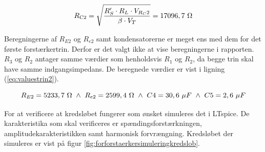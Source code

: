 \begin{equation}
R_{\mathrm{C2}} = \sqrt{\frac{R'_S \cdot R_L \cdot V_{R_C2}}{\beta \cdot V_T}} = 17096,7~\ohm
\label{eq:rc2maks}
\end{equation}

Beregningerne af $R_{E2}$ og $R_{e2}$ samt kondensatorerne er meget ens med dem for det første forstærkertrin. Derfor er det valgt ikke at vise beregningerne i rapporten. $R_3$ og $R_2$ antager samme værdier som henholdsvis $R_1$ og $R_2$, da begge trin skal have samme indgangsimpedans. De beregnede værdier er vist i ligning (\ref{eq:valuestrin2}).

\begin{equation}
R_{E2}=5233,7~\ohm ~ \wedge ~R_{e2}=2599,4~\ohm ~ \wedge ~ C4=30,6~\mu F ~ \wedge ~ C5=2,6~\mu F
\label{eq:valuestrin2}
\end{equation}

For at verificere at kredsløbet fungerer som ønsket simuleres det i LTspice. De karakteristika som skal verificeres er spændingsforstærkningen, amplitudekarakteristikken samt harmonisk forvrængning. Kredsløbet der simuleres er vist på figur \ref{fig:forforstaerkersimuleringkredslob}.
